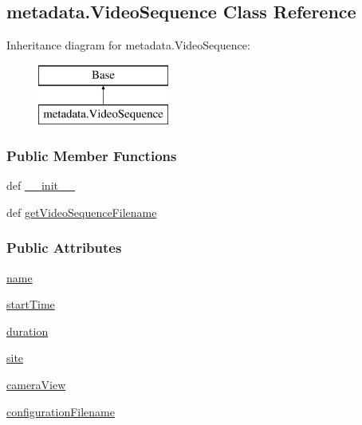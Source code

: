 \hypertarget{classmetadata_1_1VideoSequence}{\subsection{metadata.\-Video\-Sequence Class Reference}
\label{classmetadata_1_1VideoSequence}
}
Inheritance diagram for metadata.\-Video\-Sequence\-:\begin{figure}[H]
\begin{center}
\leavevmode
\includegraphics[height=2.000000cm]{classmetadata_1_1VideoSequence}
\end{center}
\end{figure}
\subsubsection*{Public Member Functions}
\begin{DoxyCompactItemize}
\item 
def \hyperlink{classmetadata_1_1VideoSequence_a44e73ee190da5af4bc6c1c639a69f2c5}{\-\_\-\-\_\-init\-\_\-\-\_\-}
\item 
def \hyperlink{classmetadata_1_1VideoSequence_aeba7cbd74a96b34c9871eecade062fc9}{get\-Video\-Sequence\-Filename}
\end{DoxyCompactItemize}
\subsubsection*{Public Attributes}
\begin{DoxyCompactItemize}
\item 
\hyperlink{classmetadata_1_1VideoSequence_a893e3ad33b8af42c58c62a47e287da34}{name}
\item 
\hyperlink{classmetadata_1_1VideoSequence_a7941063c98022fb6ed9d7e71227aa8ce}{start\-Time}
\item 
\hyperlink{classmetadata_1_1VideoSequence_a6c97a80c31e6379c483dd1ce735f1e28}{duration}
\item 
\hyperlink{classmetadata_1_1VideoSequence_a98595e8d2787337d0cad573957be5601}{site}
\item 
\hyperlink{classmetadata_1_1VideoSequence_a86bbfba5769bee7c31e75221215578d1}{camera\-View}
\item 
\hyperlink{classmetadata_1_1VideoSequence_a5696596784bf14548d3e8da6c5b053e4}{configuration\-Filename}
\end{DoxyCompactItemize}
